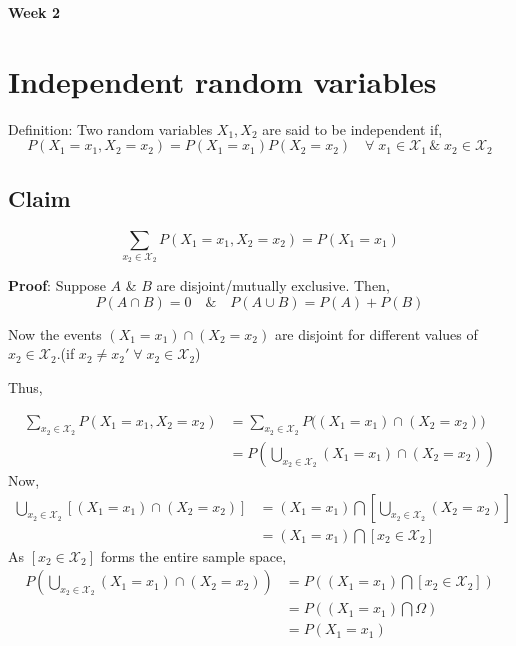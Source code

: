\documentclass{article}
\begin{document}
\begin{center}
\textbf{\huge{Week 2}}
\end{center}

\section{Independent random variables}
Definition: Two random variables $X_1, X_2 $ are said to be independent if,
$$ P(X_1=x_1,X_2=x_2)= P(X_1=x_1)P(X_2=x_2) \quad \forall \; x_1 \in \mathcal{X}_1\, \&\; x_2 \in \mathcal{X}_2$$


\subsection{Claim}
$$ \sum_{x_2 \in \mathcal{X}_2} P(X_1=x_1,X_2=x_2)=P(X_1=x_1)$$

\textbf{Proof}: Suppose $A $ \& $B$ are disjoint/mutually exclusive. Then,
$$ P(A \cap B)=0 \quad \& \quad P(A \cup B)=P(A)+P(B)$$

Now the events $(X_1=x_1)\cap (X_2=x_2)$ are disjoint for different values of $x_2\in \mathcal{X}_2$.(if $x_2 \neq x_2' \;\forall\; x_2\in \mathcal{X}_2$)

Thus,

    \begin{align*}
        \sum_{x_2 \in \mathcal{X}_2} P(X_1=x_1,X_2=x_2)& = \sum_{x_2 \in \mathcal{X}_2} P\bigl( (X_1=x_1)\cap (X_2=x_2) \bigr) \\
        &=P\left( \bigcup_{x_2 \in \mathcal{X}_2} (X_1=x_1)\cap (X_2=x_2) \right)
    \end{align*}
Now,
    \begin{align*}
        \bigcup_{x_2 \in \mathcal{X}_2} \left[(X_1=x_1)\cap (X_2=x_2) \right]
        &= (X_1=x_1)\bigcap \left[ \bigcup_{x_2 \in \mathcal{X}_2} (X_2=x_2) \right] \\
        &= (X_1=x_1)\bigcap \left[ x_2 \in \mathcal{X}_2 \right]
    \end{align*}
As $[ x_2 \in \mathcal{X}_2] $ forms the entire sample space,
\begin{align*}
    P\left( \bigcup_{x_2 \in \mathcal{X}_2} (X_1=x_1)\cap (X_2=x_2) \right) &= P\left( (X_1=x_1)\bigcap \left[ x_2 \in \mathcal{X}_2 \right] \right) \\
    &= P\left( (X_1=x_1) \bigcap \Omega \right) \\
    &= P(X_1=x_1)
\end{align*}
\end{document}

